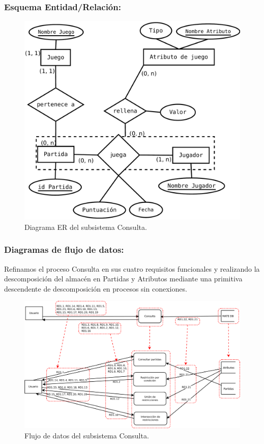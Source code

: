 \subsubsection{Esquema Entidad/Relación:}

\begin{figure}[h!]
	\centering
	\includegraphics[width=0.7\linewidth]{../Diagramas/pdf/ER-Consulta.pdf}
	\caption{Diagrama ER del subsistema Consulta.}
	
	\label{fig:ERConsulta}
\end{figure}

\subsubsection{Diagramas de flujo de datos:}

Refinamos el proceso Consulta en sus cuatro requisitos funcionales  y realizando la descomposición del almacén en Partidas y Atributos mediante una primitiva descendente de descomposición en procesos sin conexiones.
 
\begin{figure}[h!]
\centering
\includegraphics[width=0.7\linewidth]{../Diagramas/pdf/RefinamientoConsulta.pdf}
\caption{Flujo de datos del subsistema Consulta.}

\label{fig:RefinamientoConsulta}
\end{figure}

